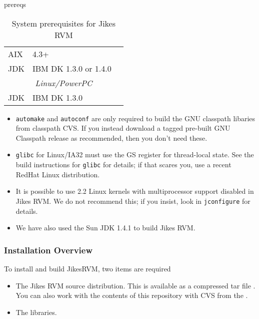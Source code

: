 \begin{Label}{prereqs}
\begin{table}[h]
\begin{center}
\begin{tabular}{|l|l|l|}
AIX            & 4.3+     &                          \\
JDK            & IBM DK 1.3.0 or 1.4.0 & \xlink{\tt \AIXJdkURL}{\AIXJdkURL} \\ \hline
\multicolumn{3}{|c|}{\em Linux/PowerPC}                      \\ \hline
JDK            & IBM DK 1.3.0    & \xlink{\tt \linuxPPCJDKURL}{\linuxPPCJDKURL} \\
\hline\hline 
\end{tabular}
\end{center}
\caption{System prerequisites for Jikes RVM}
\end{table}
\end{Label}

\begin{itemize}
\item {\tt automake} and {\tt autoconf} are only required to build the
GNU classpath libaries from classpath CVS. If you instead download a
tagged pre-built GNU Classpath release as recommended, then you don't need
these.
\item {\tt glibc} for Linux/IA32 must use the GS register for
thread-local state.  See the build instructions for {\tt glibc} for details;
if that scares you, use a recent RedHat Linux distribution.

\item It is possible to use 2.2 Linux kernels with multiprocessor
support disabled in Jikes RVM.  We do not recommend this; if you
insist, look in {\tt jconfigure} for details.
\item We have also used the Sun JDK 1.4.1 to build Jikes RVM.
\end{itemize}

\AIXPPCJikesTMFooter

\JavaTMFooter

\subsubsection{Installation Overview}

To install and build Jikes\trademark RVM, two items are required
\begin{itemize}
\item The Jikes RVM source distribution.  This is available as a
compressed tar file {\tt \RVMTarFile}.  You can also work with the
contents of this repository with CVS from the 
.

\item The 
 libraries. 
\end{itemize}

